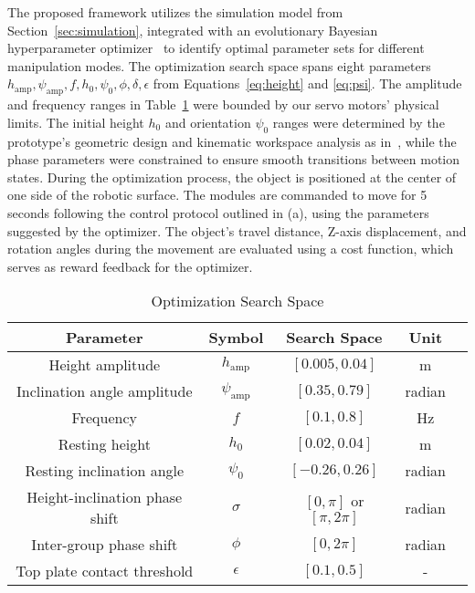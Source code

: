 The proposed framework utilizes the simulation model from Section~\ref{sec:simulation}, integrated with an evolutionary Bayesian hyperparameter optimizer~\cite{Cowen-Rivers2022-HEBO} to identify optimal parameter sets for different manipulation modes. The optimization search space spans eight parameters ${h_\text{amp}, \psi_\text{amp}, f, h_\text{0}, \psi_\text{0}, \phi, \delta, \epsilon}$ from Equations~\eqref{eq:height} and \eqref{eq:psi}. The amplitude and frequency ranges in Table~\ref{tab:opt_space} were bounded by our servo motors' physical limits. The initial height $h_0$ and orientation $\psi_0$ ranges were determined by the prototype's geometric design and kinematic workspace analysis as in~, while the phase parameters were constrained to ensure smooth transitions between motion states.
During the optimization process, the object is positioned at the center of one side of the robotic surface. The modules are commanded to move for 5\,seconds following the control protocol outlined in (a), using the parameters suggested by the optimizer. The object's travel distance, Z-axis displacement, and rotation angles during the movement are evaluated using a cost function, which serves as reward feedback for the optimizer.

\begin{table}[htbp]
\begin{center}
\caption{Optimization Search Space}
\setlength{\extrarowheight}{1pt}
    \begin{tabular}{  c  c  c  c  p{5cm} }
    \hline
   \textbf{Parameter} & \textbf{Symbol} & \textbf{Search Space} & \textbf{Unit}\\
    \hline
    Height amplitude & $h_\text{amp}$ & $$[0.005, 0.04]$$ & m\\
    Inclination angle amplitude & $\psi_\text{amp}$ & $[0.35, 0.79]$ & radian\\
    Frequency & $f$ & $[0.1, 0.8]$ & Hz\\
    Resting height & $h_\text{0}$ & $[0.02, 0.04]$ & m\\
    Resting inclination angle & $\psi_\text{0}$ & $[-0.26, 0.26]$ & radian\\
    Height-inclination phase shift & $\sigma$ & $[0, \pi]$ or $[\pi, 2\pi]$ & radian\\
    Inter-group phase shift & $\phi$ & $[0, 2\pi]$ & radian\\
    Top plate contact threshold & $\epsilon$ & $[0.1, 0.5]$ & - \\
    \hline
    \end{tabular}
    \label{tab:opt_space}
\end{center}
\end{table}

